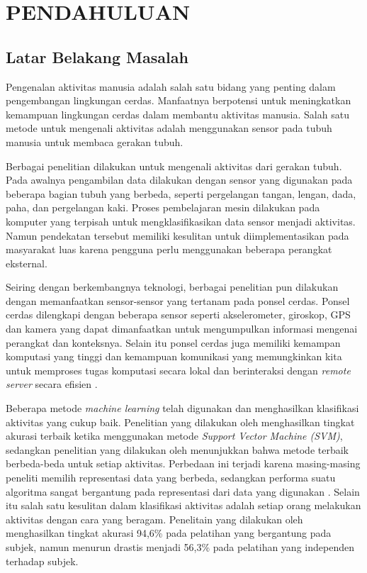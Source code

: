 \chapter{PENDAHULUAN}

\section{Latar Belakang Masalah}
Pengenalan aktivitas manusia adalah salah satu bidang yang penting dalam pengembangan lingkungan cerdas. Manfaatnya berpotensi untuk meningkatkan kemampuan lingkungan cerdas dalam membantu aktivitas manusia. Salah satu metode untuk mengenali aktivitas adalah menggunakan sensor pada tubuh manusia untuk membaca gerakan tubuh.

Berbagai penelitian dilakukan untuk mengenali aktivitas dari gerakan tubuh. Pada awalnya pengambilan data dilakukan dengan sensor yang digunakan pada beberapa bagian tubuh yang berbeda, seperti pergelangan tangan, lengan, dada, paha, dan pergelangan kaki. Proses pembelajaran mesin dilakukan pada komputer yang terpisah untuk mengklasifikasikan data sensor menjadi aktivitas. Namun pendekatan tersebut memiliki kesulitan untuk diimplementasikan pada masyarakat luas karena pengguna perlu menggunakan beberapa perangkat eksternal.

Seiring dengan berkembangnya teknologi, berbagai penelitian pun dilakukan dengan memanfaatkan sensor-sensor yang tertanam pada ponsel cerdas. Ponsel cerdas dilengkapi dengan beberapa sensor seperti akselerometer, giroskop, GPS dan kamera yang dapat dimanfaatkan untuk mengumpulkan informasi mengenai perangkat dan konteksnya. Selain itu ponsel cerdas juga memiliki kemampan komputasi yang tinggi dan kemampuan komunikasi yang memungkinkan kita untuk memproses tugas komputasi secara lokal dan berinteraksi dengan \emph{remote server} secara efisien \citep{wang-2016}.

Beberapa metode \emph{machine learning} telah digunakan dan menghasilkan klasifikasi aktivitas yang cukup baik. Penelitian yang dilakukan oleh \citet{Chiang-201413} menghasilkan tingkat akurasi terbaik ketika menggunakan metode \emph{Support Vector Machine (SVM)}, sedangkan penelitian yang dilakukan oleh \citet{shoaib-2013} menunjukkan bahwa metode terbaik berbeda-beda untuk setiap aktivitas. Perbedaan ini terjadi karena masing-masing peneliti memilih representasi data yang berbeda, sedangkan performa suatu algoritma sangat bergantung pada representasi dari data yang digunakan \citep{goodfellow-2016}. Selain itu salah satu kesulitan dalam klasifikasi aktivitas adalah setiap orang melakukan aktivitas dengan cara yang beragam. Penelitain yang dilakukan oleh \citet{tapia-2007} menghasilkan tingkat akurasi 94,6\% pada pelatihan yang bergantung pada subjek, namun menurun drastis menjadi 56,3\% pada pelatihan yang independen terhadap subjek.

